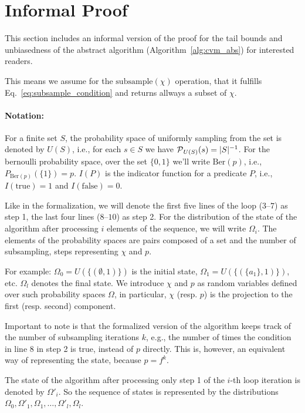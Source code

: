 \section{Informal Proof}
This section includes an informal version of the proof for the tail bounds and unbiasedness
of the abstract algorithm (Algorithm~\ref{alg:cvm_abs}) for interested readers.

This means we assume for the $\mathrm{subsample}(\chi)$ operation, that it fulfills 
Eq.~\ref{eq:subsample_condition} and returns allways a subset of $\chi$.

\paragraph{Notation:} For a finite set $S$, the probability space of uniformly sampling from the set
is denoted by $U(S)$, i.e., for each $s \in S$ we have $\operatorname{\mathcal P}_{U(S)}({s}) = |S|^{-1}$.
For the bernoulli probability space, over the set $\{0,1\}$ we'll write $\mathrm{Ber}(p)$, i.e.,
$P_{\mathrm{Ber}(p)}(\{1\}) = p$. $I(P)$ is the indicator function for a predicate $P$, i.e.,
$I(\mathrm{true}) = 1$ and $I(\mathrm{false}) = 0$.

Like in the formalization, we will denote the first five lines of the loop ($3$--$7$) as step 1, 
the last four lines ($8$--$10$) as step 2. For the distribution of the state of the algorithm after
processing $i$ elements of the sequence, we will write $\Omega_i$.
The elements of the probability spaces are pairs composed of a set and the number of subsampling, 
steps representing $\chi$ and $p$.

For example: $\Omega_0 = U(\{(\emptyset, 1)\})$ is the initial state, 
$\Omega_1 = U(\{(\{a_1\}, 1)\})$, etc. $\Omega_l$ denotes the final state.
We introduce $\chi$ and $p$ as random variables defined over such probability spaces $\Omega$, 
in particular, $\chi$ (resp. $p$) is the projection to the first (resp. second) component.

Important to note is that the formalized version of the algorithm keeps track of the number of
subsampling iterations $k$, e.g., the number of times the condition in line 8 in step 2 is true,
instead of $p$ directly. This is, however, an equivalent way of representing the state, because 
$p = f^k$.

The state of the algorithm after processing only step 1 of the $i$-th loop iteration is denoted by 
$\Omega'_i$. So the sequence of states is represented by the distributions 
$\Omega_0, \Omega'_1, \Omega_1, \ldots, \Omega'_l, \Omega_l$.


